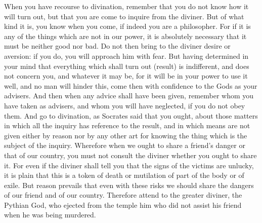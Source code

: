 When you have recourse to divination, remember that you do not know how it will
turn out, but that  you are come to inquire from the diviner.  But of what kind
it is, you  know when you come, if  indeed you are a philosopher. For  if it is
any of the things  which are not in our power, it  is absolutely necessary that
it must  be neither good nor  bad. Do not then  bring to the diviner  desire or
aversion: if you do, you will approach  him with fear. But having determined in
your mind  that everything which  shall turn  out (result) is  indifferent, and
does not concern you,  and whatever it may be, for it will  be in your power to
use it well, and no man will hinder this, come then with confidence to the Gods
as your advisers. And then when any advice shall have been given, remember whom
you have  taken as advisers, and  whom you will  have neglected, if you  do not
obey them. And go  to divination, as Socrates said that  you ought, about those
matters in  which all  the inquiry has  reference to the  result, and  in which
means are not given either by reason nor by any other art for knowing the thing
which  is the  subject of  the  inquiry. Wherefore  when  we ought  to share  a
friend's  danger or  that of  our  country, you  must not  consult the  diviner
whether you ought to share it. For even  if the diviner shall tell you that the
signs of the victims are unlucky, it is  plain that this is a token of death or
mutilation of part of the body or  of exile. But reason prevails that even with
these risks  we should  share the  dangers of  our friend  and of  our country.
Therefore attend to the greater diviner,  the Pythian God, who ejected from the
temple him who did not assist his friend when he was being murdered.
